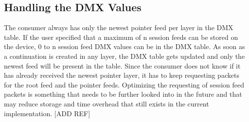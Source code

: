 \subsection{Handling the DMX Values}
The consumer always has only the newest pointer feed per layer in the DMX table. If the user specified that a maximum of n session feeds can be stored on the device, 0 to n session feed DMX values can be in the DMX table. As soon as a continuation is created in any layer, the DMX table gets updated and only the newest feed will be present in the table. Since the consumer does not know if it has already received the newest pointer layer, it has to keep requesting packets for the root feed and the pointer feeds. Optimizing the requesting of session feed packets is something that needs to be further looked into in the future and that may reduce storage and time overhead that still exists in the current implementation. [ADD REF]
